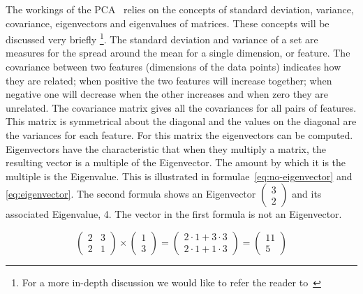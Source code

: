 The workings of the PCA~\cite{smith2002tutorial} relies on the concepts of standard deviation, variance, covariance, eigenvectors and eigenvalues of matrices.
These concepts will be discussed very briefly \footnote{For a more in-depth discussion we would like to refer the reader to~\cite{jolliffe2005principal}}.
The standard deviation and variance of a set are measures for the spread around the mean for a single dimension, or feature.
The covariance between two features (dimensions of the data points) indicates how they are related; when positive the two features will increase together; when negative one will decrease when the other increases and when zero they are unrelated.
The covariance matrix gives all the covariances for all pairs of features.
This matrix is symmetrical about the diagonal and the values on the diagonal are the variances for each feature.
For this matrix the eigenvectors can be computed. Eigenvectors have the characteristic that when they multiply a matrix, the resulting vector is a multiple of the Eigenvector.
The amount by which it is the multiple is the Eigenvalue.
This is illustrated in formulae~\ref{eq:no-eigenvector} and \ref{eq:eigenvector}.
The second formula shows an Eigenvector $ \left( \begin{smallmatrix} 3 \\ 2 \end{smallmatrix} \right)$ and its associated Eigenvalue, 4.
The vector in the first formula is not an Eigenvector.

\begin{equation}
	\label{eq:no-eigenvector}
	\begin{pmatrix} 2 & 3 \\ 2 & 1 \end{pmatrix}
	\times
	\begin{pmatrix} 1 \\ 3 \end{pmatrix}
	=
	\begin{pmatrix} 2 \cdot 1 + 3 \cdot 3 \\ 2 \cdot 1 + 1 \cdot 3
	\end{pmatrix}
	=
	\begin{pmatrix} 11 \\ 5 \end{pmatrix}
\end{equation}

